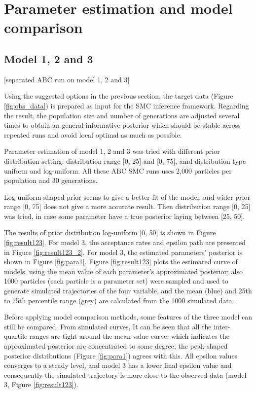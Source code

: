 \documentclass[12pt,a4paper]{report}
\begin{document}
\section{Parameter estimation and model comparison}

\subsection{Model 1, 2 and 3}

[separated ABC run on model 1, 2 and 3]

Using the suggested options in the previous section, the target data (Figure \ref{fig:obs_data}) is prepared as input for the SMC inference framework. Regarding the result, the population size and number of generations are adjusted several times to obtain an general informative posterior which should be stable across repeated runs and avoid local optimal as much as possible.

Parameter estimation of model 1, 2 and 3 was tried with different prior distribution setting: distribution range [0, 25] and [0, 75], amd distribution type uniform and log-uniform. All these ABC SMC runs uses 2,000 particles per population and 30 generations. 

Log-uniform-shaped prior seems to give a better fit of the model, and wider prior range [0, 75] does not give a more accurate result. Then distribution range [0, 25] was tried, in case some parameter have a true posterior laying between [25, 50]. 

The results of prior distribution log-uniform [0, 50] is shown in Figure \ref{fig:result123}. For model 3, the acceptance rates and epsilon path are presented in Figure \ref{fig:result123_2}. For model 3, the estimated parameters' posterior is shown in Figure \ref{fig:para1}. Figure \ref{fig:result123} plots the estimated curve of models, using the mean value of each parameter's approximated posterior; also 1000 particles (each particle is a parameter set) were sampled and used to generate simulated trajectories of the four variable, and the mean (blue) and 25th to 75th percentile range (grey) are calculated from the 1000 simulated data.

Before applying model comparison methods, some features of the three model can still be compared. From simulated curves, It can be seen that all the inter-quartile ranges are tight around the mean value curve, which indicates the approximated posterior are concentrated to some degree; the peak-shaped posterior distributions (Figure \ref{fig:para1}) agrees with this. All epsilon values converges to a steady level, and model 3 has a lower final epsilon value and consequently the simulated trajectory is more close to the observed data (model 3, Figure \ref{fig:result123}).
\end{document}
